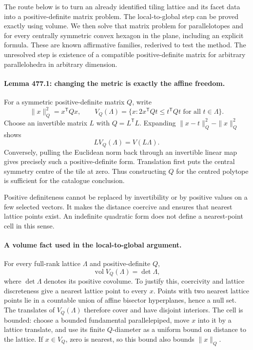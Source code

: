 \documentclass[11pt]{article}
\begin{document}
The route below is to turn an already identified tiling lattice and its
facet data into a positive-definite matrix problem. The local-to-global
step can be proved exactly using volume. We then solve that matrix
problem for parallelotopes and for every centrally symmetric convex
hexagon in the plane, including an explicit formula. These are known
affirmative families, rederived to test the method. The unresolved step
is existence of a compatible positive-definite matrix for arbitrary
parallelohedra in arbitrary dimension.

\paragraph{Lemma 477.1: changing the metric is exactly the affine freedom.}
For a symmetric positive-definite matrix $Q$, write
\[
 \|x\|_Q^2=x^{\mathsf T}Qx,\qquad
 V_Q(\Lambda)=\{x:2x^{\mathsf T}Qt\le t^{\mathsf T}Qt
                                      \text{ for all }t\in\Lambda\}.
\]
Choose an invertible matrix $L$ with $Q=L^{\mathsf T}L$. Expanding
$\|x-t\|_Q^2-\|x\|_Q^2$ shows
\begin{equation}\label{a477:affine}
                        L V_Q(\Lambda)=V(L\Lambda).
\end{equation}
Conversely, pulling the Euclidean norm back through an invertible linear
map gives precisely such a positive-definite form. Translation first
puts the central symmetry centre of the tile at zero. Thus constructing
$Q$ for the centred polytope is sufficient for the catalogue conclusion.

Positive definiteness cannot be replaced by invertibility or by positive
values on a few selected vectors. It makes the distance coercive and
ensures that nearest lattice points exist. An indefinite quadratic form
does not define a nearest-point cell in this sense.

\paragraph{A volume fact used in the local-to-global argument.}
For every full-rank lattice $\Lambda$ and positive-definite $Q$,
\begin{equation}\label{a477:volume}
                    \operatorname{vol}V_Q(\Lambda)=\det\Lambda,
\end{equation}
where $\det\Lambda$ denotes its positive covolume. To justify this,
coercivity and lattice discreteness give a nearest lattice point to
every $x$. Points with two nearest lattice points lie in a countable
union of affine bisector hyperplanes, hence a null set. The translates
of $V_Q(\Lambda)$ therefore cover and have disjoint interiors.
The cell is bounded: choose a bounded fundamental parallelepiped, move
$x$ into it by a lattice translate, and use its finite $Q$-diameter as
a uniform bound on distance to the lattice. If $x\in V_Q$, zero is
nearest, so this bound also bounds $\|x\|_Q$.
\end{document}
